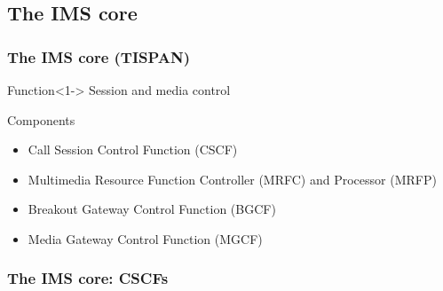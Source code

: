 \documentclass[pdf]{beamer}
\begin{document}
    \subsection{The IMS core}
    \begin{frame} 
        \frametitle{The IMS core (TISPAN)}
     \begin{overprint}     
         \begin{block}{Function}<1->
            Session and media control
         \end{block}                             
         \begin{block}{Components}
            \begin{itemize}
                    \item Call Session Control Function (CSCF)
                    \item Multimedia Resource Function Controller (MRFC) and Processor (MRFP)
                    \item Breakout Gateway Control Function (BGCF)
                    \item Media Gateway Control Function (MGCF)             
                \end{itemize}
         \end{block}
        \end{overprint}
    \end{frame}       
    \begin{frame} 
        \frametitle{The IMS core: CSCFs}
     \begin{overprint}     
     \end{overprint}
    \end{frame}     
\end{document}
